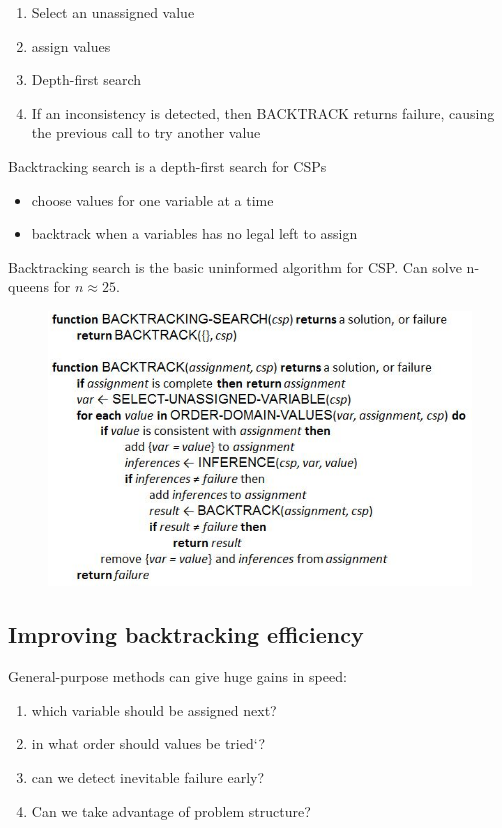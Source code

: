 \begin{enumerate}
\item Select an unassigned value
\item assign values
\item Depth-first search
\item If an inconsistency is detected, then BACKTRACK returns failure, causing the previous call to try another value
\end{enumerate}

Backtracking search is a depth-first search for CSPs
\begin{itemize}
\item choose values for one variable at a time
\item backtrack when a variables has no legal left to assign
\end{itemize}
Backtracking search is the basic uninformed algorithm for CSP.
Can solve n-queens for $n\approx 25.$
\begin{figure}[h]
\includegraphics[width=1\textwidth]{chap1_pics/backtrackcode.png}
\end{figure}

\subsection{Improving backtracking efficiency}
General-purpose methods can give huge gains in speed:\\
\begin{enumerate}
\item which variable should be assigned next?
\item in what order should values be tried`?
\item can we detect inevitable failure early?
\item Can we take advantage of problem structure? 
\end{enumerate}

